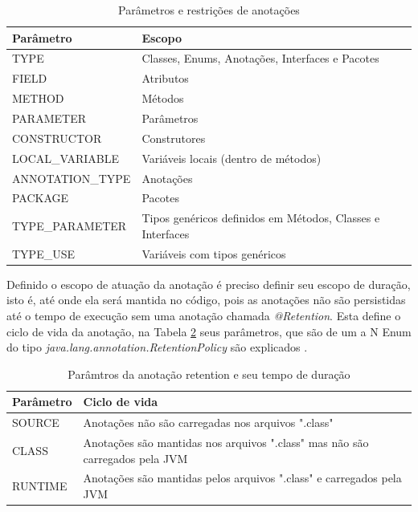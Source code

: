 \begin{table}[H]
    \centering
    \begin{tabular}{|l|l|}
        \hline
        Parâmetro & Escopo \\ \hline
        TYPE & Classes, Enums, Anotações, Interfaces e  Pacotes \\ \hline
        FIELD & Atributos \\ \hline
        METHOD & Métodos \\ \hline
        PARAMETER & Parâmetros \\ \hline
        CONSTRUCTOR & Construtores \\ \hline
        LOCAL\_VARIABLE & Variáveis locais (dentro de métodos) \\ \hline ANNOTATION\_TYPE & Anotações \\ \hline
        PACKAGE & Pacotes \\ \hline
        TYPE\_PARAMETER  & Tipos genéricos definidos em Métodos, Classes e Interfaces \\ \hline
        TYPE\_USE & Variáveis com tipos genéricos \\ \hline
\end{tabular}
    \caption{Parâmetros e restrições de anotações}
    \label{tab:targets}
\end{table}

Definido o escopo de atuação da anotação é preciso definir seu escopo de duração, isto é, até onde ela será mantida no código, pois as anotações não são persistidas até o tempo de execução sem uma anotação chamada \textit{@Retention}. Esta define o ciclo de vida da anotação, na Tabela \ref{tab:retentions} seus parâmetros, que são de um a N Enum do tipo \textit{java.lang.annotation.RetentionPolicy} são explicados .

\begin{table}[H]
    \centering
    \begin{tabular}{|l|l|} \hline
        Parâmetro & Ciclo de vida\\ \hline
        SOURCE    & Anotações não são carregadas nos arquivos ".class"\\ \hline
        CLASS     & Anotações são mantidas nos arquivos ".class" mas não são carregados pela JVM\\ \hline
        RUNTIME   & Anotações são mantidas pelos arquivos ".class" e carregados pela JVM \\ \hline
    \end{tabular}
    \caption{Parâmtros da anotação retention e seu tempo de duração}
    \label{tab:retentions}
\end{table}


